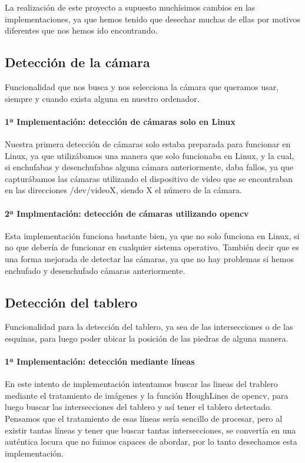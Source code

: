 \documentclass[12pt,a4paper]{report}
\begin{document}
La realización de este proyecto a supuesto muchísimos cambios en las
implementaciones, ya que hemos tenido que desechar muchas de ellas por motivos
diferentes que nos hemos ido encontrando. 


\subsection{Detección de la cámara} 
Funcionalidad que nos busca y nos selecciona la cámara que queramos usar,
siempre y cuando exista alguna en nuestro ordenador. 

\paragraph{1ª Implementación: detección de cámaras solo en Linux}

Nuestra primera detección de cámaras solo estaba preparada para funcionar en
Linux, ya que utilizábamos una manera que solo funcionaba en Linux, y la cual,
si enchufabas y desenchufabas alguna cámara anteriormente, daba fallos, ya que
capturábamos las cámaras utilizando el dispositivo de video que se encontraban
en las direcciones /dev/videoX, siendo X el número de la cámara. 

\paragraph{2ª Implmentación: detección de cámaras utilizando opencv}

Esta implementación funciona bastante bien, ya que no solo funciona en Linux, 
si no que debería de funcionar en cualquier sistema operativo. También decir que
es una forma mejorada de detectar las cámaras, ya que no hay problemas si hemos
enchufado y desenchufado cámaras anteriormente. 


\subsection{Detección del tablero} 
Funcionalidad para la detección del tablero, ya sea de las intersecciones o de
las esquinas, para luego poder ubicar la posición de las piedras de alguna
manera. 

\paragraph{1ª Implementación: detección mediante líneas}
En este intento de implementación intentamos buscar las lineas del trablero 
mediante el tratamiento de imágenes y la función HoughLines de opencv, para 
luego buscar las intersecciones del tablero y así tener el tablero detectado. 
Pensamos que el tratamiento de esas líneas sería sencillo de procesar, pero al
existir tantas líneas y tener que buscar tantas intersecciones, se convertía en
una auténtica locura que no fuimos capaces de abordar, por lo tanto desechamos
esta implementación. 
\end{document}
